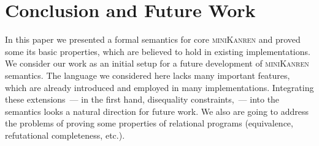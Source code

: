 \section{Conclusion and Future Work}

In this paper we presented a formal semantics for core \textsc{miniKanren} and proved some its basic properties,
which are believed to hold in existing implementations. We consider our work as an initial setup for a future development
of \textsc{miniKanren} semantics. The language we considered here lacks many important features, which are already introduced
and employed in many implementations. Integrating these extensions~--- in the first hand, disequality constraints,~--- into
the semantics looks a natural direction for future work. We also are going to address the problems of proving some
properties of relational programs (equivalence, refutational completeness, etc.).
